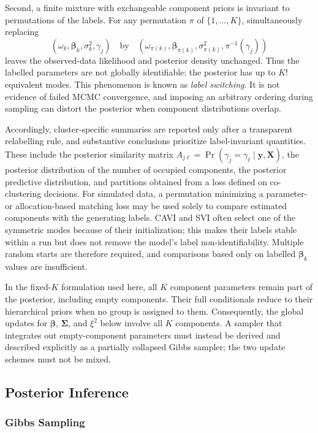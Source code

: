 Second, a finite mixture with exchangeable component priors is invariant to permutations of the labels. For any permutation $\pi$ of $\{1,\ldots,K\}$, simultaneously replacing
\[
(\omega_k,\bm\beta_k,\sigma_k^2,\gamma_j)
\quad\text{by}\quad
(\omega_{\pi(k)},\bm\beta_{\pi(k)},\sigma_{\pi(k)}^2,\pi^{-1}(\gamma_j))
\]
leaves the observed-data likelihood and posterior density unchanged. Thus the labelled parameters are not globally identifiable: the posterior has up to $K!$ equivalent modes. This phenomenon is known as \emph{label switching}. It is not evidence of failed MCMC convergence, and imposing an arbitrary ordering during sampling can distort the posterior when component distributions overlap.

Accordingly, cluster-specific summaries are reported only after a transparent relabelling rule, and substantive conclusions prioritize label-invariant quantities. These include the posterior similarity matrix $A_{j\ell}=\Pr(\gamma_j=\gamma_\ell\mid\bm y,\bm X)$, the posterior distribution of the number of occupied components, the posterior predictive distribution, and partitions obtained from a loss defined on co-clustering decisions. For simulated data, a permutation minimizing a parameter- or allocation-based matching loss may be used solely to compare estimated components with the generating labels. CAVI and SVI often select one of the symmetric modes because of their initialization; this makes their labels stable within a run but does not remove the model's label non-identifiability. Multiple random starts are therefore required, and comparisons based only on labelled $\bm\beta_k$ values are insufficient.

In the fixed-$K$ formulation used here, all $K$ component parameters remain part of the posterior, including empty components. Their full conditionals reduce to their hierarchical priors when no group is assigned to them. Consequently, the global updates for $\bm\beta$, $\bm\Sigma$, and $\xi^2$ below involve all $K$ components. A sampler that integrates out empty-component parameters must instead be derived and described explicitly as a partially collapsed Gibbs sampler; the two update schemes must not be mixed.

\newpage

\subsection{Posterior Inference}

\subsubsection{Gibbs Sampling}


